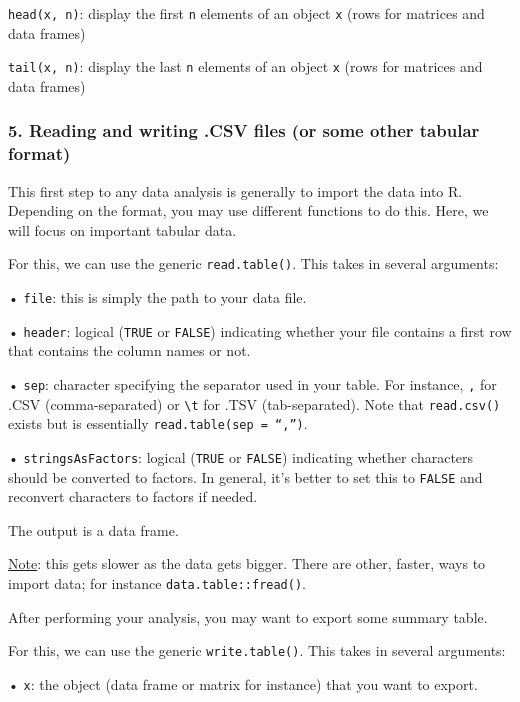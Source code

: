\documentclass[
]{article}
\begin{document}
\texttt{head(x,\ n)}: display the first \texttt{n} elements of an object
\texttt{x} (rows for matrices and data frames)

\texttt{tail(x,\ n)}: display the last \texttt{n} elements of an object
\texttt{x} (rows for matrices and data frames)

\hypertarget{reading-and-writing-.csv-files-or-some-other-tabular-format}{%
\subsubsection{5. Reading and writing .CSV files (or some other tabular
format)}\label{reading-and-writing-.csv-files-or-some-other-tabular-format}}

This first step to any data analysis is generally to import the data
into R. Depending on the format, you may use different functions to do
this. Here, we will focus on important tabular data.

For this, we can use the generic \texttt{read.table()}. This takes in
several arguments:

• \texttt{file}: this is simply the path to your data file.

• \texttt{header}: logical (\texttt{TRUE} or \texttt{FALSE}) indicating
whether your file contains a first row that contains the column names or
not.

• \texttt{sep}: character specifying the separator used in your table.
For instance, \texttt{,} for .CSV (comma-separated) or
\texttt{\textbackslash{}t} for .TSV (tab-separated). Note that
\texttt{read.csv()} exists but is essentially
\texttt{read.table(sep\ =\ “,”)}.

• \texttt{stringsAsFactors}: logical (\texttt{TRUE} or \texttt{FALSE})
indicating whether characters should be converted to factors. In
general, it's better to set this to \texttt{FALSE} and reconvert
characters to factors if needed.

The output is a data frame.

\underline{Note}: this gets slower as the data gets bigger. There are
other, faster, ways to import data; for instance
\texttt{data.table::fread()}.

After performing your analysis, you may want to export some summary
table.

For this, we can use the generic \texttt{write.table()}. This takes in
several arguments:

• \texttt{x}: the object (data frame or matrix for instance) that you
want to export.
\end{document}
